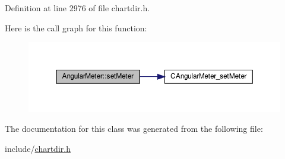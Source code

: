 Definition at line 2976 of file chartdir.\+h.

Here is the call graph for this function\+:
\nopagebreak
\begin{figure}[H]
\begin{center}
\leavevmode
\includegraphics[width=350pt]{class_angular_meter_a569e2ac4b396f2c1cafb5943f390c454_cgraph}
\end{center}
\end{figure}


The documentation for this class was generated from the following file\+:\begin{DoxyCompactItemize}
\item 
include/\hyperlink{chartdir_8h}{chartdir.\+h}\end{DoxyCompactItemize}
